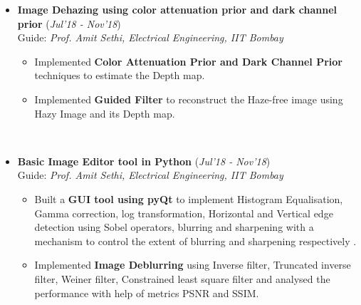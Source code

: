 \documentclass[10pt]{article}
\begin{document}
\begin{itemize}[leftmargin=0.4cm]
    \vspace{-0.25cm}



\item \textbf{Image Dehazing using color attenuation prior and dark channel prior
} \hfill{(\textit{Jul'18 - Nov'18})}\\
Guide: \textit{Prof. Amit Sethi, Electrical Engineering, IIT Bombay}\\\vspace{-0.68cm}
    \begin{itemize}
    \item Implemented \textbf{Color Attenuation Prior and Dark Channel Prior} techniques to estimate the Depth map.\vspace{-0.1cm}
    \item Implemented \textbf{Guided Filter} to reconstruct the Haze-free image using Hazy Image and its Depth map.\vspace{-0.1cm}
    \end{itemize}\
\vspace{-0.75cm}

\item \textbf{Basic Image Editor tool in Python
}
\hfill{(\textit{Jul'18 - Nov'18})}\\
Guide: \textit{Prof. Amit Sethi, Electrical Engineering, IIT Bombay}\\\vspace{-0.68cm}
    \begin{itemize}
    \item Built a \textbf{GUI tool using pyQt} to implement Histogram Equalisation, Gamma correction, log transformation, Horizontal and Vertical edge detection using Sobel operators, blurring and sharpening with a mechanism to control the extent of blurring and sharpening respectively .\vspace{-0.1cm}
    \item Implemented \textbf{Image Deblurring} using Inverse filter, Truncated inverse filter, Weiner filter, Constrained least square filter and analysed the performance with help of metrics PSNR and SSIM.\vspace{-0.1cm}
    \end{itemize}\
\vspace{-0.75cm}


\end{itemize}
\end{document}
